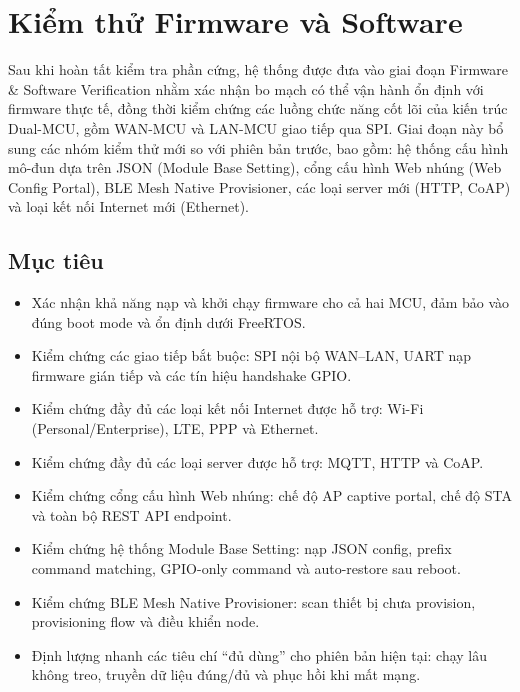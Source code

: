 \section{Kiểm thử Firmware và Software}

Sau khi hoàn tất kiểm tra phần cứng, hệ thống được đưa vào giai đoạn Firmware \& Software Verification nhằm xác nhận bo mạch có thể vận hành ổn định với firmware thực tế, đồng thời kiểm chứng các luồng chức năng cốt lõi của kiến trúc Dual-MCU, gồm WAN-MCU và LAN-MCU giao tiếp qua SPI. Giai đoạn này bổ sung các nhóm kiểm thử mới so với phiên bản trước, bao gồm: hệ thống cấu hình mô-đun dựa trên JSON (Module Base Setting), cổng cấu hình Web nhúng (Web Config Portal), BLE Mesh Native Provisioner, các loại server mới (HTTP, CoAP) và loại kết nối Internet mới (Ethernet).
    
    \subsection{Mục tiêu}
    
        \begin{itemize}
            \item Xác nhận khả năng nạp và khởi chạy firmware cho cả hai MCU, đảm bảo vào đúng boot mode và ổn định dưới FreeRTOS.
            \item Kiểm chứng các giao tiếp bắt buộc: SPI nội bộ WAN--LAN, UART nạp firmware gián tiếp và các tín hiệu handshake GPIO.
            \item Kiểm chứng đầy đủ các loại kết nối Internet được hỗ trợ: Wi-Fi (Personal/Enterprise), LTE, PPP và Ethernet.
            \item Kiểm chứng đầy đủ các loại server được hỗ trợ: MQTT, HTTP và CoAP.
            \item Kiểm chứng cổng cấu hình Web nhúng: chế độ AP captive portal, chế độ STA và toàn bộ REST API endpoint.
            \item Kiểm chứng hệ thống Module Base Setting: nạp JSON config, prefix command matching, GPIO-only command và auto-restore sau reboot.
            \item Kiểm chứng BLE Mesh Native Provisioner: scan thiết bị chưa provision, provisioning flow và điều khiển node.
            \item Định lượng nhanh các tiêu chí ``đủ dùng'' cho phiên bản hiện tại: chạy lâu không treo, truyền dữ liệu đúng/đủ và phục hồi khi mất mạng.
        \end{itemize}
    
